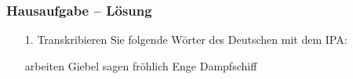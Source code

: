 
\begin{frame}
\frametitle{Hausaufgabe -- Lösung}

\begin{itemize}
	\item[1.] {Transkribieren Sie folgende Wörter des Deutschen mit dem IPA:}

		\begin{exe}
		\settowidth{} 
		\begin{xlist}
			\ex arbeiten
			\ex Giebel
			\ex sagen
			\ex fröhlich
			\ex Enge
			\ex Dampfschiff
		\end{xlist}
	\end{exe}

\end{itemize}

\end{frame}	


